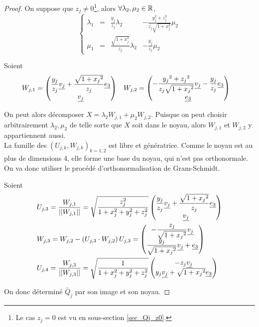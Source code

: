 \begin{proof}
On suppose que $z_j\not= 0$\footnote{Le cas $z_j=0$ est vu en sous-section \ref{sec_Qj_z0}.}, alors $\forall \lambda_2, \mu_2 \in \mathbb R$,
\[
\left\lbrace
\begin{matrix}
\lambda_1 &=& \frac{y_j}{z_j}\lambda_2& - \frac{y_j^2 + z_j^2}{z_j\sqrt{1+x_j^2}}\mu_2\\
  \mu_1 &=& \frac{\sqrt{1+x_j^2}}{z_j}\lambda_2& - \frac{y_j}{z_j}\mu_2
\end{matrix}
\right.
\]

Soient \begin{align*}
&W_{j,1} = \begin{pmatrix} \dfrac{{y_j}}{{z_j}}{\underline{v_j}} + \dfrac{ \sqrt{1+{x_j}^2}}{{z_j}}\underline{e_3}\\{\underline{v_j}}\end{pmatrix}
&&W_{j,2} = \begin{pmatrix} -\dfrac{{y_j}^2+{z_j}^2}{{z_j} \sqrt{1+{x_j}^2}}{\underline{v_j}} - \dfrac{{y_j}}{{z_j}}\underline{e_3}\\\underline{e_3}\end{pmatrix}
\end{align*}


On peut alors décomposer $X = \lambda_2 W_{j,1} + \mu_2 W_{j,2}$. Puisque on peut choisir arbitrairement $\lambda_2, \mu_2$ de telle sorte que $X$ soit dans le noyau, alors $W_{j,1}$ et $W_{j,2}$ y appartiennent aussi.\\


La famille des $(U_{j,k},W_{j,k})_{k=1,2}$ est libre et génératrice. Comme le noyau est au plus de dimensions 4, elle forme une base du noyau, qui n'est pas orthonormale. On va donc utiliser le procédé d'orthonormalisation de Gram-Schmidt.

Soient \begin{align*}
&U_{j,3} = \dfrac{W_{j,1}}{||W_{j,1}||} = \sqrt{\dfrac{z_j^2}{1+x_j^2 +y_j^2+z_j^2}}\begin{pmatrix} \dfrac{{y_j}}{{z_j}}{\underline{v_j}} + \dfrac{ \sqrt{1+{x_j}^2}}{{z_j}}\underline{e_3}\\{\underline{v_j}}\end{pmatrix}\\
&W_{j,3} = W_{j,2} - \left( U_{j,3}\cdot W_{j,2} \right)U_{j,3} = \begin{pmatrix} -\dfrac{z_j}{\sqrt{1+{x_j}^2}}\underline{v_j} \\ \dfrac{y_j}{\sqrt{1+{x_j}^2}}\underline{v_j} + \underline{e_3}\end{pmatrix}\\
&U_{j,4} = \dfrac{W_{j,3}}{||W_{j,3}||} = \sqrt{\dfrac{1}{1+x_j^2 +y_j^2+z_j^2}}\begin{pmatrix} -z_j\underline{v_j} \\ y_j\underline{v_j} + \sqrt{1+{x_j}^2} \underline{e_3}\end{pmatrix}
\end{align*}



On donc déterminé $\tilde{Q_j}$ par son image et son noyau.
\end{proof}


